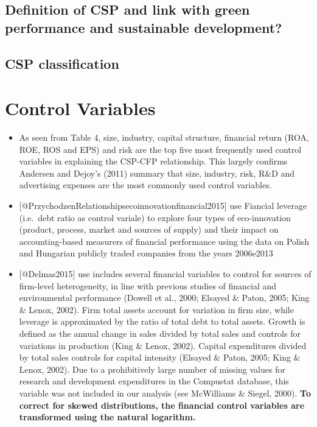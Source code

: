 \documentclass[]{article}
\begin{document}
\subsection{Definition of CSP and link with green performance and
sustainable
development?}\label{definition-of-csp-and-link-with-green-performance-and-sustainable-development}

\subsection{CSP classification}\label{csp-classification}

\section{Control Variables}\label{control-variables}

\begin{itemize}
\item
  As seen from Table 4, size, industry, capital structure, financial
  return (ROA, ROE, ROS and EPS) and risk are the top five most
  frequently used control variables in explaining the CSP-CFP
  relationship. This largely confirms Andersen and Dejoy's (2011)
  summary that size, industry, risk, R\&D and advertising expenses are
  the most commonly used control variables.
\item
  {[}@PrzychodzenRelationshipsecoinnovationfinancial2015{]} use Fiancial
  leverage (i.e.~debt ratio as control variale) to explore four types of
  eco-innovation (product, process, market and sources of supply) and
  their impact on accounting-based measurers of financial performance
  using the data on Polish and Hungarian publicly traded companies from
  the years 2006e2013
\item
  {[}@Delmas2015{]} use includes several financial variables to control
  for sources of firm-level heterogeneity, in line with previous studies
  of financial and environmental performance (Dowell et al., 2000;
  Elsayed \& Paton, 2005; King \& Lenox, 2002). Firm total assets
  account for variation in firm size, while leverage is approximated by
  the ratio of total debt to total assets. Growth is defined as the
  annual change in sales divided by total sales and controls for
  variations in production (King \& Lenox, 2002). Capital expenditures
  divided by total sales controls for capital intensity (Elsayed \&
  Paton, 2005; King \& Lenox, 2002). Due to a prohibitively large number
  of missing values for research and development expenditures in the
  Compustat database, this variable was not included in our analysis
  (see McWilliams \& Siegel, 2000). \textbf{To correct for skewed
  distributions, the financial control variables are transformed using
  the natural logarithm.}
\end{itemize}
\end{document}
